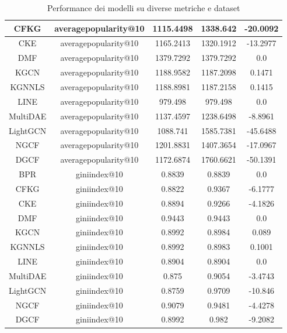 \begin{table}[H]
{\begin{tabular}{|c|c|c|c|c|}
    CFKG & averagepopularity@10 & 1115.4498 & 1338.642 & -20.0092 \\ \hline
    CKE & averagepopularity@10 & 1165.2413 & 1320.1912 & -13.2977 \\ \hline
    DMF & averagepopularity@10 & 1379.7292 & 1379.7292 & 0.0 \\ \hline
    KGCN & averagepopularity@10 & 1188.9582 & 1187.2098 & 0.1471 \\ \hline
    KGNNLS & averagepopularity@10 & 1188.8981 & 1187.2158 & 0.1415 \\ \hline
    LINE & averagepopularity@10 & 979.498 & 979.498 & 0.0 \\ \hline
    MultiDAE & averagepopularity@10 & 1137.4597 & 1238.6498 & -8.8961 \\ \hline
    LightGCN & averagepopularity@10 & 1088.741 & 1585.7381 & -45.6488 \\ \hline
    NGCF & averagepopularity@10 & 1201.8831 & 1407.3654 & -17.0967 \\ \hline
    DGCF & averagepopularity@10 & 1172.6874 & 1760.6621 & -50.1391 \\ \hline
    BPR & giniindex@10 & 0.8839 & 0.8839 & 0.0 \\ \hline
    CFKG & giniindex@10 & 0.8822 & 0.9367 & -6.1777 \\ \hline
    CKE & giniindex@10 & 0.8894 & 0.9266 & -4.1826 \\ \hline
    DMF & giniindex@10 & 0.9443 & 0.9443 & 0.0 \\ \hline
    KGCN & giniindex@10 & 0.8992 & 0.8984 & 0.089 \\ \hline
    KGNNLS & giniindex@10 & 0.8992 & 0.8983 & 0.1001 \\ \hline
    LINE & giniindex@10 & 0.8904 & 0.8904 & 0.0 \\ \hline
    MultiDAE & giniindex@10 & 0.875 & 0.9054 & -3.4743 \\ \hline
    LightGCN & giniindex@10 & 0.8759 & 0.9709 & -10.846 \\ \hline
    NGCF & giniindex@10 & 0.9079 & 0.9481 & -4.4278 \\ \hline
    DGCF & giniindex@10 & 0.8992 & 0.982 & -9.2082 \\ \hline
\end{tabular}
    }
    \caption{Performance dei modelli su diverse metriche e dataset}
    \end{table}


